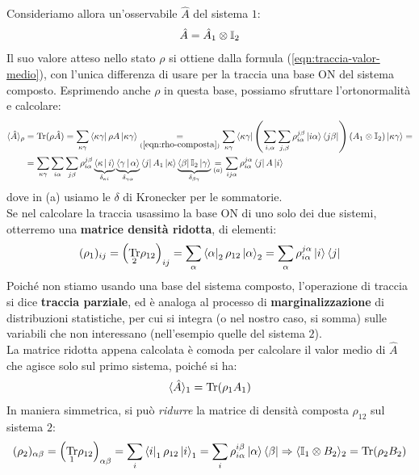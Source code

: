 \documentclass[../../InformazioneQuantistica.tex]{subfiles}
\begin{document}
Consideriamo allora un'osservabile $\hat{A}$ del sistema $1$:
\begin{align*}
\hat{A} = \hat{A}_1 \otimes \mathbb{I}_2
\end{align*}
Il suo valore atteso nello stato $\rho$ si ottiene dalla formula (\ref{eqn:traccia-valor-medio}), con l'unica differenza di usare per la traccia una base ON del sistema composto. Esprimendo anche $\rho$ in questa base, possiamo sfruttare l'ortonormalità e calcolare:
\begin{align*}
\langle \hat{A}\rangle_\rho &=
\operatorname{Tr}(\rho \hat{A}) = \sum_{\kappa\gamma}\Bra{\kappa\gamma} \rho A 
\Ket{\kappa\gamma} \underset{(\ref{eqn:rho-composta})}{=} \sum_{\kappa\gamma} \Bra{\kappa\gamma} \left(\sum_{i,\alpha}\sum_{j,\beta}\rho_{i\alpha}^{j\beta}\Ket{i\alpha}\Bra{j\beta}\right)
\left(A_1 \otimes \mathbb{I}_2\right)  \Ket{\kappa\gamma} =\\
&= \sum_{\kappa \gamma} \sum_{i\alpha}\sum_{j\beta} \rho_{i\alpha}^{j\beta} \underbrace{\Braket{\kappa|i}}_{\delta_{\kappa i}}\underbrace{\Braket{\gamma|\alpha}}_{\delta_{\gamma \alpha}}\Bra{j}A_1\Ket{\kappa}\underbrace{\Bra{\beta}\mathbb{I}_2\Ket{\gamma}}_{\delta_{\beta \gamma}} \underset{(a)}{=}\sum_{ij \alpha} \rho_{i\alpha}^{j\alpha}\Bra{j}A\Ket{i} 
\end{align*}
dove in (a) usiamo le $\delta$ di Kronecker per  le sommatorie.\\

Se nel calcolare la traccia usassimo la base ON di uno solo dei due sistemi, otterremo una \textbf{matrice densità ridotta}, di elementi:
\begin{align*}
(\rho_1)_{ij} = \left(\underset{2}{\operatorname{Tr}}\rho_{12}\right)_{ij} =\sum_\alpha \Bra{\alpha}_2 \rho_{12}\Ket{\alpha}_2 = \sum_\alpha \rho_{i\alpha}^{j\alpha} \Ket{i}\Bra{j}
\end{align*}
Poiché non stiamo usando una base del sistema composto, l'operazione di traccia si dice \textbf{traccia parziale}, ed è analoga al processo di \textbf{marginalizzazione} di distribuzioni statistiche, per cui si integra (o nel nostro caso, si somma) sulle variabili che non interessano (nell'esempio quelle del sistema $2$).\\
La matrice ridotta appena calcolata è comoda per calcolare il valor medio di $\hat{A}$ che agisce solo sul primo sistema, poiché si ha:
\begin{align*}
\langle \hat{A}\rangle_1 = \operatorname{Tr}(\rho_1 A_1)
\end{align*}
In maniera simmetrica, si può \textit{ridurre} la matrice di densità composta $\rho_{12}$ sul sistema $2$:
\begin{align*}
(\rho_2)_{\alpha\beta}= \left(\underset{1}{\operatorname{Tr}} \rho_{12}\right)_{\alpha\beta} = \sum_i \Bra{i}_1 \rho_{12}\Ket{i}_1 = \sum_i \rho_{i\alpha}^{i\beta} \Ket{\alpha}\Bra{\beta} \Rightarrow  \langle \mathbb{I}_1\otimes {B}_2\rangle_2 = \operatorname{Tr}(\rho_2 B_2)
\end{align*}
\end{document}
